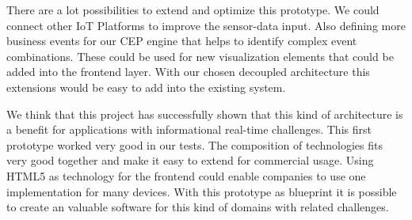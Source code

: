 \documentclass{acm_proc_article-sp}
\begin{document}
There are a lot possibilities to extend and optimize this prototype. We could connect other IoT Platforms to improve the sensor-data input. Also defining more business events for our CEP engine that helps to identify complex event combinations. These could be used for new visualization elements that could be added into the frontend layer.
With our chosen decoupled architecture this extensions would be easy to add into the existing system.



We think that this project has successfully shown that this kind of architecture is a benefit for applications with informational real-time challenges. This first prototype worked very good in our tests. The composition of technologies fits very good together and make it easy to extend for commercial usage. Using HTML5 as technology for the frontend could enable companies to use one implementation for many devices. 
With this prototype as blueprint it is possible to create an valuable software for this kind of domains with related challenges.


%

%
%
\end{document}

